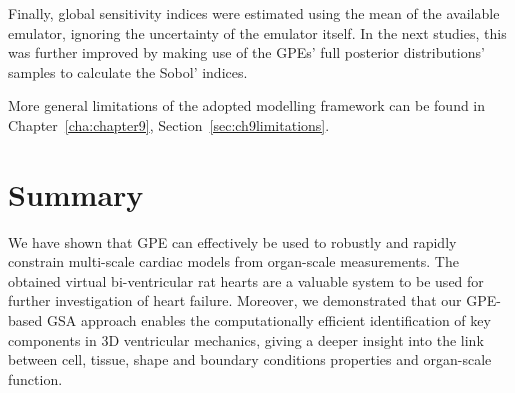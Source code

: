 \vspace{0.2cm}
Finally, global sensitivity indices were estimated using the mean of the available emulator, ignoring the uncertainty of the emulator itself. In the next studies, this was further improved by making use of the GPEs' full posterior distributions' samples to calculate the Sobol' indices.

\vspace{0.2cm}
More general limitations of the adopted modelling framework can be found in Chapter~\ref{cha:chapter9}, Section~\ref{sec:ch9limitations}.


%
%
%
\section{Summary}\label{sec:ch4summary}
We have shown that GPE can effectively be used to robustly and rapidly constrain multi-scale cardiac models from organ-scale measurements. The obtained virtual bi-ventricular rat hearts are a valuable system to be used for further investigation of heart failure. Moreover, we demonstrated that our GPE-based GSA approach enables the computationally efficient identification of key components in 3D ventricular mechanics, giving a deeper insight into the link between cell, tissue, shape and boundary conditions properties and organ-scale function.